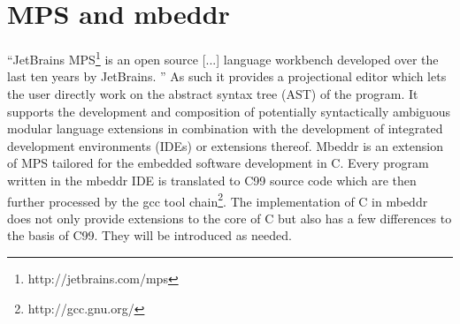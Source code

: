 \section{MPS and mbeddr}
``JetBrains MPS\footnote{http://jetbrains.com/mps} is an open source [...] language workbench developed over the last ten years by JetBrains. ''\cite{GenericTools_SpecificLanguages} As such it provides a projectional editor which lets the user directly work on the abstract syntax tree (AST) of the program\cite{LanguageWorkbenches}. It supports the development and composition of potentially syntactically ambiguous modular language extensions in combination with the development of integrated development environments (IDEs) or extensions thereof. Mbeddr is an extension of MPS tailored for the embedded software development in C. Every program written in the mbeddr IDE is translated to C99 source code which are then further processed by the gcc tool chain\footnote{http://gcc.gnu.org/}. The implementation of C in mbeddr does not only provide extensions to the core of C but also has a few differences to the basis of C99. They will be introduced as needed.

